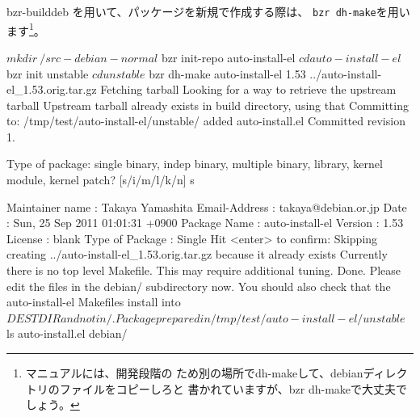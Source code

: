 \documentclass[mingoth,a4paper]{jsarticle}
\begin{document}
bzr-builddeb を用いて、パッケージを新規で作成する際は、
\verb|bzr dh-make|を用います\footnote{マニュアルには、開発段階の
ため別の場所でdh-makeして、debianディレクトリのファイルをコピーしろと
書かれていますが、bzr dh-makeで大丈夫でしょう。}。

\begin{commandline}
 $ mkdir ~/src-debian-normal
 $ bzr init-repo auto-install-el
 $ cd auto-install-el
 $ bzr init unstable
 $ cd unstable

 $ bzr dh-make auto-install-el 1.53 ../auto-install-el_1.53.orig.tar.gz
Fetching tarball
Looking for a way to retrieve the upstream tarball
Upstream tarball already exists in build directory, using that
Committing to: /tmp/test/auto-install-el/unstable/
added auto-install.el
Committed revision 1.

Type of package: single binary, indep binary, multiple binary, library,
 kernel module, kernel patch?
 [s/i/m/l/k/n] s

Maintainer name  : Takaya Yamashita
Email-Address    : takaya@debian.or.jp
Date             : Sun, 25 Sep 2011 01:01:31 +0900
Package Name     : auto-install-el
Version          : 1.53
License          : blank
Type of Package  : Single
Hit <enter> to confirm:
Skipping creating ../auto-install-el_1.53.orig.tar.gz because it already
 exists
Currently there is no top level Makefile. This may require additional
 tuning.
Done. Please edit the files in the debian/ subdirectory now. You should
 also
check that the auto-install-el Makefiles install into $DESTDIR and not
 in / .
Package prepared in /tmp/test/auto-install-el/unstable
 $ ls
auto-install.el  debian/
\end{commandline}

\end{document}
